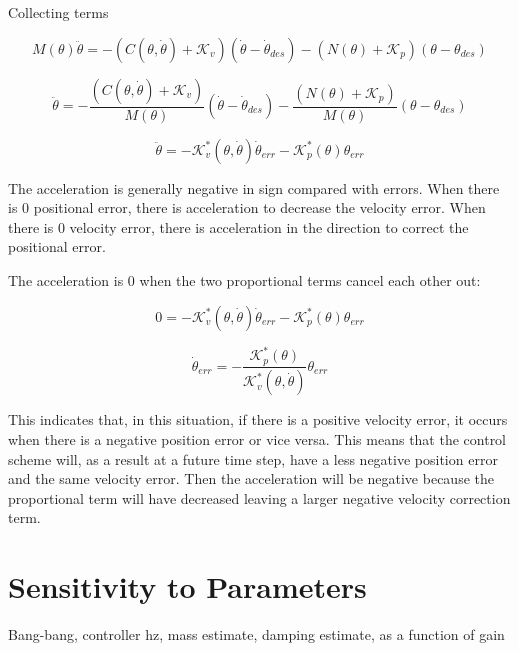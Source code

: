 \documentclass[12pt, letterpaper, oneside, notitlepage, onecolumn]{article}
\newcommand{\bbs}[1]{\section{#1}}
\begin{document}
Collecting terms

\begin{equation}
M(\theta) \ddot{\theta}
= 
-(C(\theta, \dot{\theta})
+ \mathcal{K}_{v}) (\dot{\theta} - \dot{\theta}_{des})
- (N(\theta)
+ \mathcal{K}_{p}) (\theta - \theta_{des})
\end{equation}

\begin{equation}
\ddot{\theta}
= 
-\dfrac{(C(\theta, \dot{\theta})
+ \mathcal{K}_{v})}{M(\theta)}
(\dot{\theta} - \dot{\theta}_{des})
-\dfrac{(N(\theta)
+ \mathcal{K}_{p})}{M(\theta)} (\theta - \theta_{des})
\end{equation}

\begin{equation}
\ddot{\theta}
= 
-\mathcal{K}_{v}^{*}(\theta, \dot{\theta})
\dot{\theta}_{err}
-\mathcal{K}_{p}^{*}(\theta)
\theta_{err}
\end{equation}

The acceleration is generally negative in sign compared with errors. When there
is 0 positional error, there is acceleration to decrease the velocity error.
When there is 0 velocity error, there is acceleration in the direction to
correct the positional error.

The acceleration is 0 when the two proportional terms cancel each other out:

\begin{equation}
0
= 
-\mathcal{K}_{v}^{*}(\theta, \dot{\theta})
\dot{\theta}_{err}
-\mathcal{K}_{p}^{*}(\theta)
\theta_{err}
\end{equation}

\begin{equation}
\dot{\theta}_{err}
= 
-\dfrac{\mathcal{K}_{p}^{*}(\theta)}{\mathcal{K}_{v}^{*}(\theta, \dot{\theta})}
\theta_{err}
\end{equation}

This indicates that, in this situation, if there is a positive velocity error, 
it occurs when there is a negative position error or vice versa. This means that
the control scheme will, as a result at a future time step, have a less negative
position error and the same velocity error. Then the acceleration will be
negative because the proportional term will have decreased leaving a larger
negative velocity correction term.

\bbs{Sensitivity to Parameters}

Bang-bang, controller hz, mass estimate, damping estimate, as a function of gain
\end{document}
